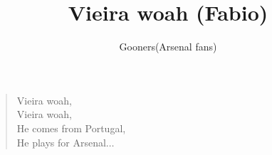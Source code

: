 \documentclass[a4paper,12pt]{article}
\title{Vieira woah (Fabio)}
\author{Gooners(Arsenal fans)}
\date{}
\begin{document}
	
	\maketitle
	
	\begin{verse}
		
		Vieira woah, \\
		Vieira woah, \\
		He comes from Portugal, \\
		He plays for Arsenal$\ldots$
		
	\end{verse}
	
\end{document}
